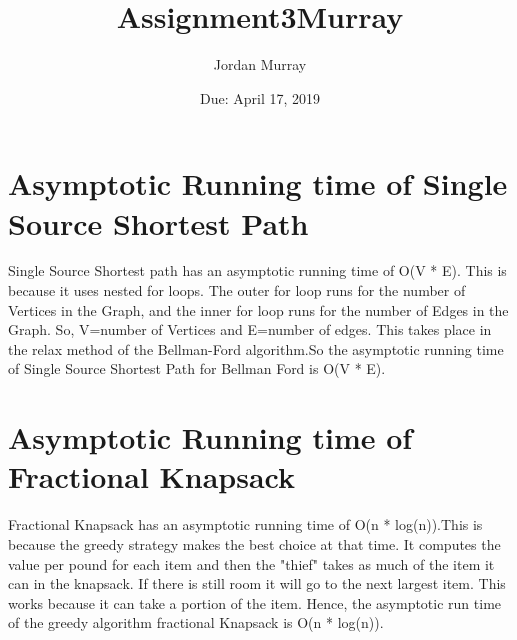 \documentclass{article}
\title{Assignment3Murray}
\author{Jordan Murray }
\date{Due: April 17, 2019}
\begin{document}
\maketitle

\section{Asymptotic Running time of Single Source Shortest Path}
\noindent
Single Source Shortest path has an asymptotic running time of O(V * E). This is because it uses nested for loops. The outer for loop runs for the number of Vertices in the Graph, and the inner for loop runs for the number of Edges in the Graph. So, V=number of Vertices and E=number of edges. This takes place in the relax method of the Bellman-Ford algorithm.So the asymptotic running time of Single Source Shortest Path for Bellman Ford is O(V * E).

\section{Asymptotic Running time of Fractional Knapsack}
\noindent
Fractional Knapsack has an asymptotic running time of O(n * log(n)).This is because the greedy strategy makes the best choice at that time. It computes the value per pound for each item and then the "thief" takes as much of the item it can in the knapsack. If there is still room it will go to the next largest item. This works because it can take a portion of the item. Hence, the asymptotic run time of the greedy algorithm fractional Knapsack is O(n * log(n)).
\end{document}

